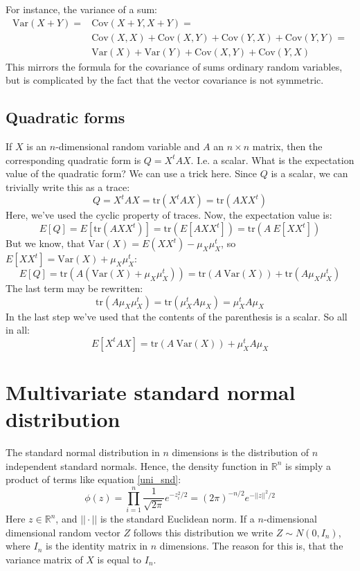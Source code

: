 \documentclass[12pt, a4paper]{article}
\numberwithin{equation}{section}
\begin{document}
For instance, the variance of a sum:
\begin{align}
\textrm{Var}(X+Y)=&\textrm{Cov}(X+Y,X+Y)=\\
&\textrm{Cov}(X,X)+\textrm{Cov}(X,Y)+\textrm{Cov}(Y,X)+\textrm{Cov}(Y,Y)=\\
&\textrm{Var}(X)+\textrm{Var}(Y)+\textrm{Cov}(X,Y)+\textrm{Cov}(Y,X)
\end{align}
This mirrors the formula for the covariance of sums ordinary random variables, but is complicated by the fact that the vector covariance is not symmetric.

\subsection{Quadratic forms}
If $X$ is an $n$-dimensional random variable and $A$ an $n\times n$ matrix, then the corresponding quadratic form is $Q=X^tAX$. I.e. a scalar. What is the expectation value of the quadratic form? We can use a trick here. Since $Q$ is a scalar, we can trivially write this as a trace:
\begin{equation}
Q=X^tAX=\textrm{tr}(X^tAX)=\textrm{tr}(AXX^t)
\end{equation}
Here, we've used the cyclic property of traces. Now, the expectation value is:
\begin{equation}
E[Q]=E[\textrm{tr}(AXX^t)]=\textrm{tr}(E[AXX^t])=\textrm{tr}(A\ E[XX^t])
\end{equation}
But we know, that $\textrm{Var}(X)=E(XX^t)-\mu_X\mu_X^t$, so $E[XX^t]=\textrm{Var}(X)+\mu_X\mu_X^t$:
\begin{equation}
E[Q]=\textrm{tr}(A(\textrm{Var}(X)+\mu_X\mu_X^t))=\textrm{tr}(A\ \textrm{Var}(X))+\textrm{tr}(A\mu_X\mu_X^t)
\end{equation}
The last term may be rewritten:
\begin{equation}
\textrm{tr}(A\mu_X\mu_X^t)=\textrm{tr}(\mu_X^t A\mu_X)=\mu_X^t A\mu_X
\end{equation}
In the last step we've used that the contents of the parenthesis is a scalar. So all in all:
\begin{equation}
E[X^tAX]=\textrm{tr}(A\ \textrm{Var}(X))+\mu_X^t A\mu_X
\end{equation}

\section{Multivariate standard normal distribution}
The standard normal distribution in $n$ dimensions is the distribution of $n$ independent standard normals. Hence, the density function in $\mathbb{R}^n$ is simply a product of terms like equation \ref{uni_snd}:
\begin{equation}
\phi(z)=\prod_{i=1}^n\frac{1}{\sqrt{2\pi}}e^{-z_i^2/2}=(2\pi)^{-n/2}e^{-||z||^2/2}
\end{equation}
Here $z\in\mathbb{R}^n$, and $||\cdot ||$ is the standard Euclidean norm. If a $n$-dimensional dimensional random vector $Z$ follows this distribution we write $Z\sim N(0,I_n)$, where $I_n$ is the identity matrix in $n$ dimensions. The reason for this is, that the variance matrix of $X$ is equal to $I_n$.
\end{document}
